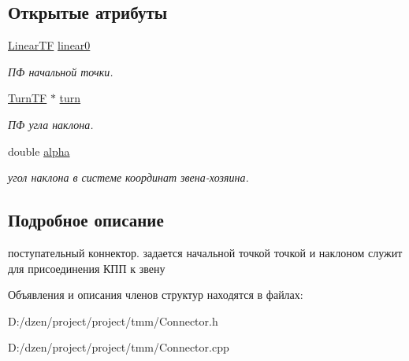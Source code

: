 \subsection*{Открытые атрибуты}
\begin{DoxyCompactItemize}
\item 
\hypertarget{struct_connector_sliding_a285f90fc23abe40d919a2ac8064a9299}{
\hyperlink{struct_linear_t_f}{LinearTF} \hyperlink{struct_connector_sliding_a285f90fc23abe40d919a2ac8064a9299}{linear0}}
\label{struct_connector_sliding_a285f90fc23abe40d919a2ac8064a9299}

\begin{DoxyCompactList}\small\item\em ПФ начальной точки. \item\end{DoxyCompactList}\item 
\hypertarget{struct_connector_sliding_a1cacb3a42e8c2c12c5e0e76ead663f4e}{
\hyperlink{struct_turn_t_f}{TurnTF} $\ast$ \hyperlink{struct_connector_sliding_a1cacb3a42e8c2c12c5e0e76ead663f4e}{turn}}
\label{struct_connector_sliding_a1cacb3a42e8c2c12c5e0e76ead663f4e}

\begin{DoxyCompactList}\small\item\em ПФ угла наклона. \item\end{DoxyCompactList}\item 
\hypertarget{struct_connector_sliding_a6e6f56b4d66f5aeb7cc394b1d76c1fd9}{
double \hyperlink{struct_connector_sliding_a6e6f56b4d66f5aeb7cc394b1d76c1fd9}{alpha}}
\label{struct_connector_sliding_a6e6f56b4d66f5aeb7cc394b1d76c1fd9}

\begin{DoxyCompactList}\small\item\em угол наклона в системе координат звена-\/хозяина. \item\end{DoxyCompactList}\end{DoxyCompactItemize}


\subsection{Подробное описание}
поступательный коннектор. задается начальной точкой точкой и наклоном служит для присоединения КПП к звену 

Объявления и описания членов структур находятся в файлах:\begin{DoxyCompactItemize}
\item 
D:/dzen/project/project/tmm/Connector.h\item 
D:/dzen/project/project/tmm/Connector.cpp\end{DoxyCompactItemize}
